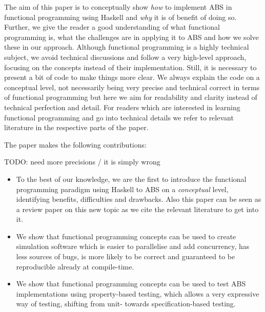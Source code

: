 The aim of this paper is to conceptually show \textit{how} to implement ABS in functional programming using Haskell and \textit{why} it is of benefit of doing so. Further, we give the reader a good understanding of what functional programming is, what the challenges are in applying it to ABS and how we solve these in our approach. Although functional programming is a highly technical subject, we avoid technical discussions and follow a very high-level approach, focusing on the concepts instead of their implementation. Still, it is necessary to present a bit of code to make things more clear. We always explain the code on a conceptual level, not necessarily being very precise and technical correct in terms of functional programming but here we aim for readability and clarity instead of technical perfection and detail. For readers which are interested in learning functional programming and go into technical details we refer to relevant literature in the respective parts of the paper.

The paper makes the following contributions:

TODO: need more precisions / it is simply wrong
\begin{itemize}
	\item To the best of our knowledge, we are the first to introduce the functional programming paradigm using Haskell to ABS on a \textit{conceptual} level, identifying benefits, difficulties and drawbacks. Also this paper can be seen as a review paper on this new topic as we cite the relevant literature to get into it.
	\item We show that functional programming concepts can be used to create simulation software which is easier to parallelise and add concurrency, has less sources of bugs, is more likely to be correct and guaranteed to be reproducible already at compile-time.
	\item We show that functional programming concepts can be used to test ABS implementations using property-based testing, which allows a very expressive way of testing, shifting from unit- towards specification-based testing.
\end{itemize}